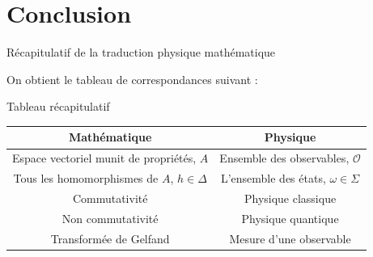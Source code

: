 \documentclass[11pt, xcolor=table]{beamer}
\begin{document}


\section{Conclusion}

\begin{frame}{Récapitulatif de la traduction physique mathématique}

    On obtient le tableau de correspondances suivant :
    \renewcommand{\arraystretch}{1.5}
    \setlength{\tabcolsep}{0.2cm}
    \begin{block}{Tableau récapitulatif}
        \begin{tabular}{|c|c|}
            \hline
            \textbf{Mathématique} & \textbf{Physique} \\
            \hline
            Espace vectoriel munit de propriétés, $A$ & Ensemble des observables, $\mathcal{O}$\\
            \hline
            Tous les homomorphismes de $A$, $ h \in \Delta$ & L'ensemble des états, $\omega \in \Sigma$ \\
            \hline
            Commutativité & Physique classique\\
            \hline 
            Non commutativité & Physique quantique \\
            \hline
            Transformée de Gelfand & Mesure d'une observable \\
            \hline
        \end{tabular}
    \end{block}
\end{frame} 


\nocite{*}

\begin{frame}

    
\end{frame}
\end{document}
